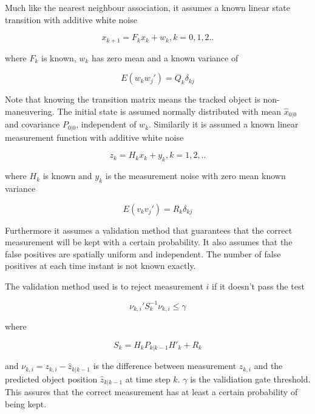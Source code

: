 Much like the nearest neighbour association, it assumes a known linear state transition with additive white noise

\begin{equation}
    x_{k+1} = F_kx_k + w_k, k=0,1,2..
\end{equation}

where $F_k$ is known, $w_k$ has zero mean and a known variance of 

\begin{equation}
    E(w_kw_j') = Q_k\delta_{kj}
\end{equation}

Note that knowing the transition matrix means the tracked object is non-maneuvering. The initial state is assumed normally distributed with mean $\hat{x}_{0|0}$ and covariance $P_{0|0}$, independent of $w_k$. Similarily it is assumed a known linear measurement function with additive white noise

\begin{equation}
    z_k = H_kx_k + y_k, k = 1,2,..
\end{equation}

where $H_k$ is known and $y_k$ is the measurement noise with zero mean known variance 

\begin{equation}
    E(v_kv_j') = R_k\delta_{kj}
\end{equation}



Furthermore it assumes a validation method that guarantees that the correct measurement will be kept with a certain probability. It also assumes that the false positives are spatially uniform and independent. The number of false positives at each time instant is not known exactly.   

The validation method used is to reject measurement $i$ if it doesn't pass the test

\begin{equation}
    \nu_{k,i}'S_k^{-1}\nu_{k,i} \leq \gamma
\end{equation}

where 

\begin{equation}
    S_k = H_kP_{k|k-1}H'_k+R_k
\end{equation}

and $\nu_{k,i} = z_{k,i} - \hat{z}_{k|k-1}$ is the difference between measurement $z_{k,i}$ and the predicted object position $\hat{z}_{k|k-1}$ at time step $k$. $\gamma$ is the validiation gate threshold. This assures that the correct measurement has at least a certain probability of being kept. 

